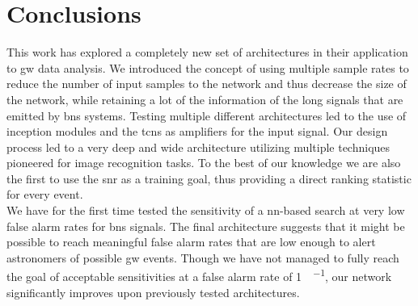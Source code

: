 \section{Conclusions}
\begin{comment}
\textcolor{blue}{Well duh, give a conclusion and maybe outlook.}\\
\textcolor{red}{Mention that the PyCBC Live pipeline has probably (talk to Alex about this) a higher latency than our search (they have latency on average \SI{16}{\s} \cite{pycbc_live}) but already give rough parameter estimation and sky localization which we can't do. They furthermore are a lot more sensitive.}
\begin{itemize}
	\item First time anybody tested sensitivity of a \gls{nn} for \gls{bns} signals at such a low false alarm rate
	\item Computationally very efficient therefore lower latency (need to quantify this)
	\item At the moment network probably too complicated and therefore hyper parameters probably not optimal
	\item Introduced new architecture of using a TCN as denoiser. Also the cascading architecture is new and promising
	\item Network not yet ready to use
	\item Couldn't work with real detector data yet, as it also wouldn't be sensible with our sensitivity
	\item Still interesting as it has shown potential with easier data
\end{itemize}
\end{comment}
This work has explored a completely new set of architectures in their application to \gls{gw} data analysis. We introduced the concept of using multiple sample rates to reduce the number of input samples to the network and thus decrease the size of the network, while retaining a lot of the information of the long signals that are emitted by \gls{bns} systems. Testing multiple different architectures led to the use of inception modules and the \gls{tcn}s as amplifiers for the input signal. Our design process led to a very deep and wide architecture utilizing multiple techniques pioneered for image recognition tasks. To the best of our knowledge we are also the first to use the \gls{snr} as a training goal, thus providing a direct ranking statistic for every event.\\
We have for the first time tested the sensitivity of a \gls{nn}-based search at very low false alarm rates for \gls{bns} signals. The final architecture suggests that it might be possible to reach meaningful false alarm rates that are low enough to alert astronomers of possible \gls{gw} events. Though we have not managed to fully reach the goal of acceptable sensitivities at a false alarm rate of \SI[per-mode=fraction]{1}{\sample\per\month}, our network significantly improves upon previously tested architectures.\\
